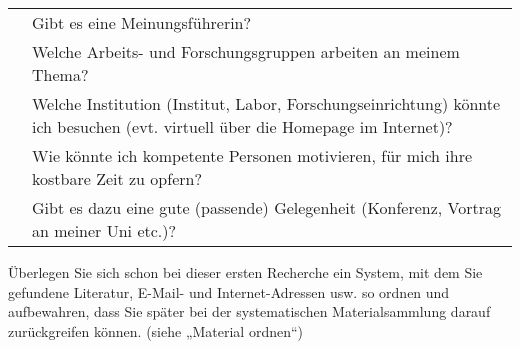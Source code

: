 \documentclass[]{article}
\begin{document}
\begin{longtable}[]{@{}ll@{}}
\begin{minipage}[t]{0.27\columnwidth}\raggedright\strut
\strut
\end{minipage} & \begin{minipage}[t]{0.67\columnwidth}\raggedright\strut
Gibt es eine Meinungsführerin?\strut
\end{minipage}\tabularnewline
\begin{minipage}[t]{0.27\columnwidth}\raggedright\strut
\strut
\end{minipage} & \begin{minipage}[t]{0.67\columnwidth}\raggedright\strut
Welche Arbeits- und Forschungsgruppen arbeiten an meinem Thema?\strut
\end{minipage}\tabularnewline
\begin{minipage}[t]{0.27\columnwidth}\raggedright\strut
\strut
\end{minipage} & \begin{minipage}[t]{0.67\columnwidth}\raggedright\strut
Welche Institution (Institut, Labor, Forschungseinrichtung) könnte ich
besuchen (evt. virtuell über die Homepage im Internet)?\strut
\end{minipage}\tabularnewline
\begin{minipage}[t]{0.27\columnwidth}\raggedright\strut
\strut
\end{minipage} & \begin{minipage}[t]{0.67\columnwidth}\raggedright\strut
Wie könnte ich kompetente Personen motivieren, für mich ihre kostbare
Zeit zu opfern?\strut
\end{minipage}\tabularnewline
\begin{minipage}[t]{0.27\columnwidth}\raggedright\strut
\strut
\end{minipage} & \begin{minipage}[t]{0.67\columnwidth}\raggedright\strut
Gibt es dazu eine gute (passende) Gelegenheit (Konferenz, Vortrag an
meiner Uni etc.)?\strut
\end{minipage}\tabularnewline
\bottomrule
\end{longtable}

Überlegen Sie sich schon bei dieser ersten Recherche ein System, mit dem
Sie gefundene Literatur, E-Mail- und Internet-Adressen usw. so ordnen
und aufbewahren, dass Sie später bei der systematischen Materialsammlung
darauf zurückgreifen können. (siehe „Material ordnen``)
\end{document}
